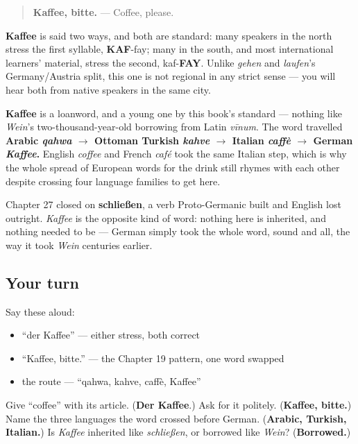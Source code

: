 \begin{quote}
\textbf{Kaffee, bitte.} — Coffee, please.
\end{quote}

\begin{sounds}
\textbf{Kaffee} is said two ways, and both are standard: many speakers in the north stress the first syllable, \textbf{KAF}-fay; many in the south, and most international learners' material, stress the second, kaf-\textbf{FAY}. Unlike \emph{gehen} and \emph{laufen}'s Germany/Austria split, this one is not regional in any strict sense — you will hear both from native speakers in the same city.
\end{sounds}

\begin{cousinweb}
\textbf{Kaffee} is a loanword, and a young one by this book's standard — nothing like \emph{Wein}'s two-thousand-year-old borrowing from Latin \emph{vīnum}. The word travelled \textbf{Arabic \emph{qahwa} $\to$ Ottoman Turkish \emph{kahve} $\to$ Italian \emph{caffè} $\to$ German \emph{Kaffee}.} English \emph{coffee} and French \emph{café} took the same Italian step, which is why the whole spread of European words for the drink still rhymes with each other despite crossing four language families to get here.

Chapter 27 closed on \textbf{schließen}, a verb Proto-Germanic built and English lost outright. \emph{Kaffee} is the opposite kind of word: nothing here is inherited, and nothing needed to be — German simply took the whole word, sound and all, the way it took \emph{Wein} centuries earlier.
\end{cousinweb}

\subsection*{Your turn}
Say these aloud:

\begin{itemize}
\raggedright
  \item \textquotedblleft{}der Kaffee\textquotedblright{} — either stress, both correct
  \item \textquotedblleft{}Kaffee, bitte.\textquotedblright{} — the Chapter 19 pattern, one word swapped
  \item the route — \textquotedblleft{}qahwa, kahve, caffè, Kaffee\textquotedblright{}
\end{itemize}

\begin{tcolorbox}[breakable,colback=teal!4,colframe=teal!35!black,title={Before you move on}]
Give \textquotedblleft{}coffee\textquotedblright{} with its article. (\textbf{Der Kaffee}.) Ask for it politely. (\textbf{Kaffee, bitte.}) Name the three languages the word crossed before German. (\textbf{Arabic, Turkish, Italian.}) Is \emph{Kaffee} inherited like \emph{schließen}, or borrowed like \emph{Wein}? (\textbf{Borrowed.})
\end{tcolorbox}
